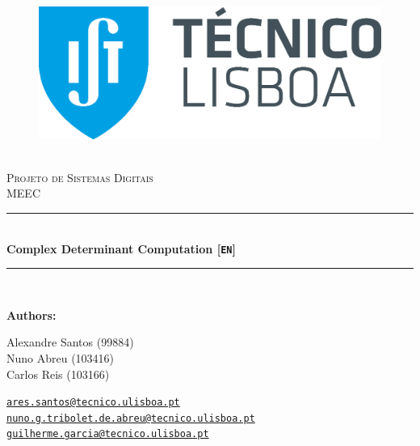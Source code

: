 \documentclass[12pt]{article}
\newcommand{\HRule}{\rule{\linewidth}{0.5mm}} %
\begin{document}
\begin{center}
    \begin{figure}
        \vspace{-1.0cm}
        \includegraphics[scale = 0.3, left]{images/IST_A.eps} %
    \end{figure}
    \mbox{}\\[2.0cm]
    \textsc{\Huge Projeto de Sistemas Digitais}\\[2.5cm]
    \textsc{\LARGE MEEC}\\[2.0cm]
    \HRule\\[0.4cm]
    {\large \bf {\selectfont Complex Determinant Computation} [\texttt{EN}]}\\[0.2cm]
    \HRule\\[1.5cm]
\end{center}

\begin{flushleft}
    \textbf{\selectfont Authors:}
\end{flushleft}

\begin{center}
    \begin{minipage}{0.4\textwidth}
        \begin{flushleft}
            Alexandre Santos (99884)\\
            Nuno Abreu (103416)\\
            Carlos Reis (103166) \\
        \end{flushleft}
    \end{minipage}%
    \begin{minipage}{0.6\textwidth}
        \begin{flushright}
            \href{mailto:ares.santos@tecnico.ulisboa.pt}{\texttt{ares.santos@tecnico.ulisboa.pt}}\\
            \href{mailto:nuno.g.tribolet.de.abreu@tecnico.ulisboa.pt}{\texttt{nuno.g.tribolet.de.abreu@tecnico.ulisboa.pt}}\\
            \href{mailto:guilherme.garcia@tecnico.ulisboa.pt}{\texttt{guilherme.garcia@tecnico.ulisboa.pt}}\\
            
        \end{flushright}
    \end{minipage}


\end{center}
    
\end{document}
